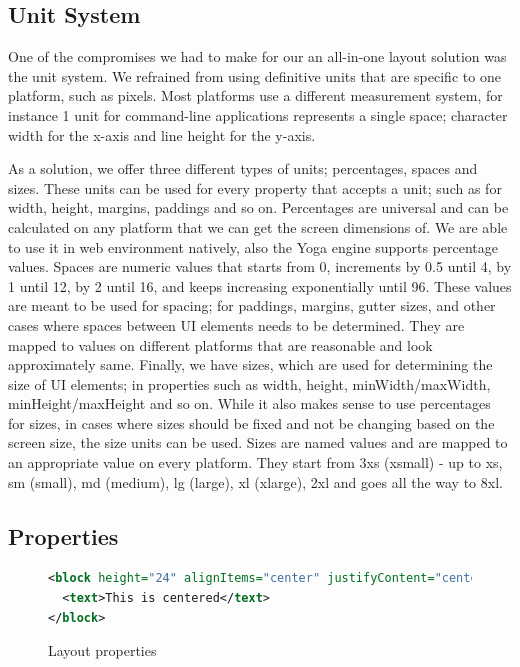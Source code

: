 \subsection{Unit System}

One of the compromises we had to make for our an all-in-one layout solution was the unit system. We refrained from using definitive units that are specific to one platform, such as pixels. Most platforms use a different measurement system, for instance 1 unit for command-line applications represents a single space; character width for the x-axis and line height for the y-axis.

As a solution, we offer three different types of units; percentages, spaces and sizes. These units can be used for every property that accepts a unit; such as for width, height, margins, paddings and so on. Percentages are universal and can be calculated on any platform that we can get the screen dimensions of. We are able to use it in web environment natively, also the Yoga engine supports percentage values. Spaces are numeric values that starts from 0, increments by 0.5 until 4, by 1 until 12, by 2 until 16, and keeps increasing exponentially until 96. These values are meant to be used for spacing; for paddings, margins, gutter sizes, and other cases where spaces between UI elements needs to be determined. They are mapped to values on different platforms that are reasonable and look approximately same. Finally, we have sizes, which are used for determining the size of UI elements; in properties such as width, height, minWidth/maxWidth, minHeight/maxHeight and so on. While it also makes sense to use percentages for sizes, in cases where sizes should be fixed and not be changing based on the screen size, the size units can be used. Sizes are named values and are mapped to an appropriate value on every platform. They start from 3xs (xsmall) - up to xs, sm (small), md (medium), lg (large), xl (xlarge), 2xl and goes all the way to 8xl.

\subsection{Properties}

\begin{figure}[H]
\begin{minipage}{\linewidth}
\begin{lstlisting}[language=xml]
<block height="24" alignItems="center" justifyContent="center">
  <text>This is centered</text>
</block>
\end{lstlisting}
\end{minipage}
\caption{Layout properties}%
\label{fig:layout_props_example}%
\end{figure}

